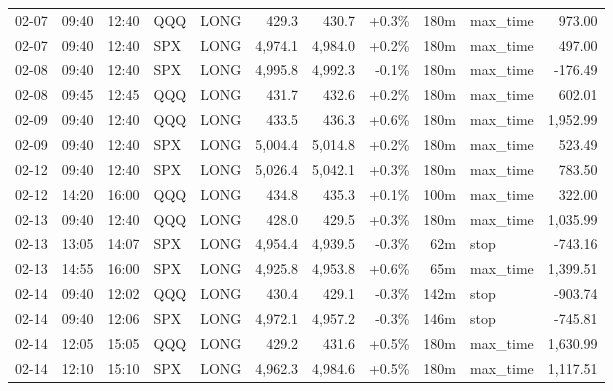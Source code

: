 \documentclass[11pt,a4paper,twoside]{article}
\begin{document}
\begin{center}
\begin{longtable}{>{\color{txtmain}}l l l l l r r r r >{\color{txtmain}}l r}
02-07 & 09:40 & 12:40 & QQQ & LONG & 429.3 & 430.7 & \textcolor{wingreen}{+0.3\%} & 180m & max\_time & \textcolor{wingreen}{973.00} \\
02-07 & 09:40 & 12:40 & SPX & LONG & 4,974.1 & 4,984.0 & \textcolor{wingreen}{+0.2\%} & 180m & max\_time & \textcolor{wingreen}{497.00} \\
02-08 & 09:40 & 12:40 & SPX & LONG & 4,995.8 & 4,992.3 & \textcolor{lossred}{-0.1\%} & 180m & max\_time & \textcolor{lossred}{-176.49} \\
02-08 & 09:45 & 12:45 & QQQ & LONG & 431.7 & 432.6 & \textcolor{wingreen}{+0.2\%} & 180m & max\_time & \textcolor{wingreen}{602.01} \\
02-09 & 09:40 & 12:40 & QQQ & LONG & 433.5 & 436.3 & \textcolor{wingreen}{+0.6\%} & 180m & max\_time & \textcolor{wingreen}{1,952.99} \\
02-09 & 09:40 & 12:40 & SPX & LONG & 5,004.4 & 5,014.8 & \textcolor{wingreen}{+0.2\%} & 180m & max\_time & \textcolor{wingreen}{523.49} \\
02-12 & 09:40 & 12:40 & SPX & LONG & 5,026.4 & 5,042.1 & \textcolor{wingreen}{+0.3\%} & 180m & max\_time & \textcolor{wingreen}{783.50} \\
02-12 & 14:20 & 16:00 & QQQ & LONG & 434.8 & 435.3 & \textcolor{wingreen}{+0.1\%} & 100m & max\_time & \textcolor{wingreen}{322.00} \\
02-13 & 09:40 & 12:40 & QQQ & LONG & 428.0 & 429.5 & \textcolor{wingreen}{+0.3\%} & 180m & max\_time & \textcolor{wingreen}{1,035.99} \\
02-13 & 13:05 & 14:07 & SPX & LONG & 4,954.4 & 4,939.5 & \textcolor{lossred}{-0.3\%} & 62m & stop & \textcolor{lossred}{-743.16} \\
02-13 & 14:55 & 16:00 & SPX & LONG & 4,925.8 & 4,953.8 & \textcolor{wingreen}{+0.6\%} & 65m & max\_time & \textcolor{wingreen}{1,399.51} \\
02-14 & 09:40 & 12:02 & QQQ & LONG & 430.4 & 429.1 & \textcolor{lossred}{-0.3\%} & 142m & stop & \textcolor{lossred}{-903.74} \\
02-14 & 09:40 & 12:06 & SPX & LONG & 4,972.1 & 4,957.2 & \textcolor{lossred}{-0.3\%} & 146m & stop & \textcolor{lossred}{-745.81} \\
02-14 & 12:05 & 15:05 & QQQ & LONG & 429.2 & 431.6 & \textcolor{wingreen}{+0.5\%} & 180m & max\_time & \textcolor{wingreen}{1,630.99} \\
02-14 & 12:10 & 15:10 & SPX & LONG & 4,962.3 & 4,984.6 & \textcolor{wingreen}{+0.5\%} & 180m & max\_time & \textcolor{wingreen}{1,117.51} \\

\end{longtable}
\end{center}
\end{document}
